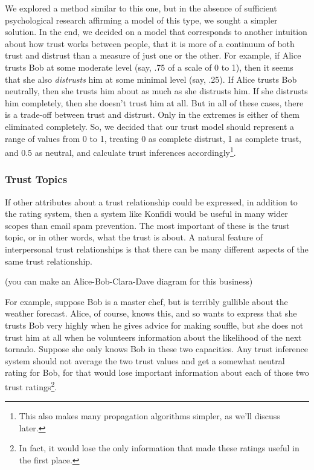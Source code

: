 \documentclass[onecolumn]{acm_proc_article-sp}
\begin{document}
We explored a method similar to this one, but in the absence of sufficient psychological research affirming a model of this type, we sought a simpler solution.  In the end, we decided on a model that corresponds to another intuition about how trust works between people, that it is more of a continuum of both trust and distrust than a measure of just one or the other.  For example, if Alice trusts Bob at some moderate level (say, .75 of a scale of 0 to 1), then it seems that she also \textit{distrusts} him at some minimal level (say, .25).  If Alice trusts Bob neutrally, then she trusts him about as much as she distrusts him.  If she distrusts him completely, then she doesn't trust him at all.  But in all of these cases, there is a trade-off between trust and distrust.  Only in the extremes is either of them eliminated completely.  So, we decided that our trust model should represent a range of values from 0 to 1, treating 0 as complete distrust, 1 as complete trust, and 0.5 as neutral, and calculate trust inferences accordingly\footnote{This also makes many propagation algorithms simpler, as we'll discuss later.}.

\subsubsection{Trust Topics}
If other attributes about a trust relationship could be expressed, in addition to the rating system, then a system like Konfidi would be useful in many wider scopes than email spam prevention.  The most important of these is the trust topic, or in other words, what the trust is about.  A natural feature of interpersonal trust relationships is that there can be many different aspects of the same trust relationship.  

(you can make an Alice-Bob-Clara-Dave diagram for this business)

For example, suppose Bob is a master chef, but is terribly gullible about the weather forecast.  Alice, of course, knows this, and so wants to express that she trusts Bob very highly when he gives advice for making souffle, but she does not trust him at all when he volunteers information about the likelihood of the next tornado.  Suppose she only knows Bob in these two capacities.  Any trust inference system should not average the two trust values and get a somewhat neutral rating for Bob, for that would lose important information about each of those two trust ratings\footnote{In fact, it would lose the only information that made these ratings useful in the first place.}.
\end{document}
